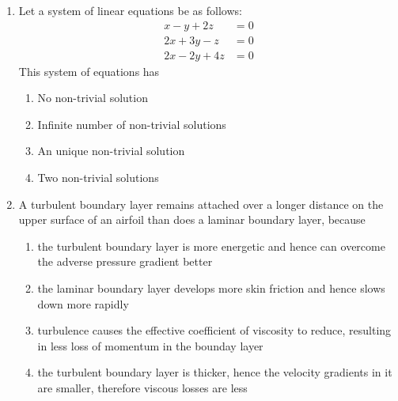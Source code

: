 \documentclass[journal]{IEEEtran}
\begin{document}
\begin{enumerate}
		
	\item Let a system of linear equations be as follows:
		\begin{align*}
			x - y + 2z &= 0\\
			2x + 3y - z &= 0\\
			2x-2y+4z &=0
		\end{align*}
		This system of equations has

		\begin{enumerate}
			\item No non-trivial solution
			\item Infinite number of non-trivial solutions
			\item An unique non-trivial solution
			\item Two non-trivial solutions
		\end{enumerate}

	\item A turbulent boundary layer remains attached over a longer distance on the upper surface of an airfoil than does a laminar boundary layer, because
		\begin{enumerate}
			\item the turbulent boundary layer is more energetic and hence can overcome the adverse pressure gradient better
			\item the laminar boundary layer develops more skin friction and hence slows down more rapidly
			\item turbulence causes the effective coefficient of viscosity to reduce, resulting in less loss of momentum in the bounday layer
			\item the turbulent boundary layer is thicker, hence the velocity gradients in it are smaller, therefore viscous losses are less
		\end{enumerate}

\end{enumerate}

  
\end{document}
